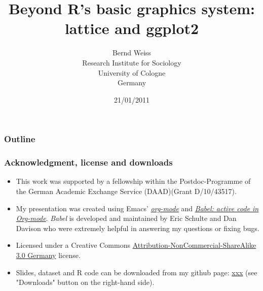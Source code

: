 \documentclass[bigger]{beamer}
\begin{document}
\title{Beyond R's basic graphics system: lattice and ggplot2}
\author{Bernd Weiss\\Research Institute for Sociology\\University of Cologne\\Germany\\}
\date{21/01/2011 \vfill \byncsa}
\maketitle

\begin{frame}
\frametitle{Outline}
\setcounter{tocdepth}{3}
\tableofcontents
\end{frame}





\newcommand{\infobox}[1]{
  \vfill\vfill\hrule
  \begin{columns}[t]
    \begin{column}{0.02\textwidth}
      \Info
    \end{column}
    \begin{column}[T]{0.97\textwidth}
      \tiny{#1}
    \end{column}
\end{columns}}



\begin{frame}\frametitle{Acknowledgment, license and downloads}
\begin{itemize}
\item This work was supported by a fellowship within the Postdoc-Programme of the German Academic
  Exchange Service (DAAD)(Grant D/10/43517).
\item My presentation was created using Emacs' \href{http://orgmode.org/}{\emph{org-mode}} and
\href{http://orgmode.org/worg/org-contrib/babel/}{\emph{Babel: active code in
Org-mode}}. \emph{Babel} is developed and maintained by Eric Schulte and Dan Davison who were extremely
helpful in answering my questions or fixing bugs.
\item Licensed under a Creative Commons
\href{http://creativecommons.org/licenses/by-nc-sa/3.0/de/deed.en}{Attribution-NonCommercial-ShareAlike
3.0 Germany} license.
\item Slides, dataset and R code can be downloaded from my github page:
\href{xxx}{xxx} (see
"Downloads" button on the right-hand side).
\end{itemize}
\end{frame}
\end{document}
